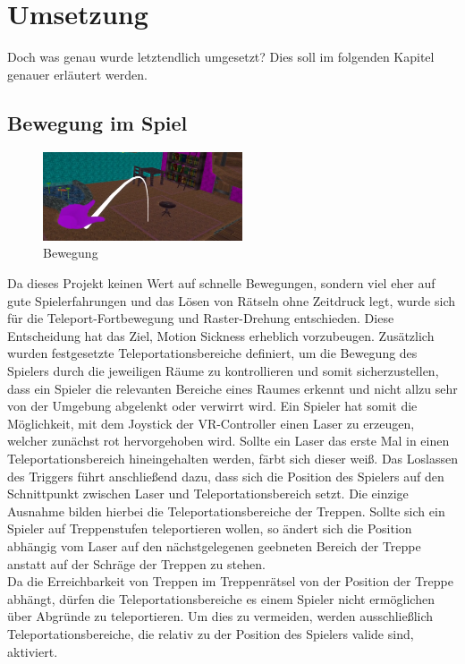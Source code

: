 \chapter{Umsetzung}
Doch was genau wurde letztendlich umgesetzt? Dies soll im folgenden Kapitel genauer erläutert werden.

\section{Bewegung im Spiel}
\begin{figure}
	\vspace*{-0.5cm}
	\includegraphics[width=5.9cm]{Pictures/Bewegung}
	\caption{Bewegung}
	\vspace*{0cm}
	\label{fig:bewegung}
\end{figure}

Da dieses Projekt keinen Wert auf schnelle Bewegungen, sondern viel eher auf gute Spielerfahrungen und das Lösen von Rätseln ohne Zeitdruck legt, wurde sich für die Teleport-Fortbewegung und Raster-Drehung entschieden. Diese Entscheidung hat das Ziel, Motion Sickness erheblich vorzubeugen. Zusätzlich wurden festgesetzte Teleportationsbereiche definiert, um die Bewegung des Spielers durch die jeweiligen Räume zu kontrollieren und somit sicherzustellen, dass ein Spieler die relevanten Bereiche eines Raumes erkennt und nicht allzu sehr von der Umgebung abgelenkt oder verwirrt wird. Ein Spieler hat somit die Möglichkeit, mit dem Joystick der VR-Controller einen Laser zu erzeugen, welcher zunächst rot hervorgehoben wird. Sollte ein Laser das erste Mal in einen Teleportationsbereich hineingehalten werden, färbt sich dieser weiß. Das Loslassen des Triggers führt anschließend dazu, dass sich die Position des Spielers auf den Schnittpunkt zwischen Laser und Teleportationsbereich setzt. Die einzige Ausnahme bilden hierbei die Teleportationsbereiche der Treppen. Sollte sich ein Spieler auf Treppenstufen teleportieren wollen, so ändert sich die Position abhängig vom Laser auf den nächstgelegenen geebneten Bereich der Treppe anstatt auf der Schräge der Treppen zu stehen.\\
Da die Erreichbarkeit von Treppen im Treppenrätsel von der Position der Treppe abhängt, dürfen die Teleportationsbereiche es einem Spieler nicht ermöglichen über Abgründe zu teleportieren. Um dies zu vermeiden, werden ausschließlich Teleportationsbereiche, die relativ zu der Position des Spielers valide sind, aktiviert. 


